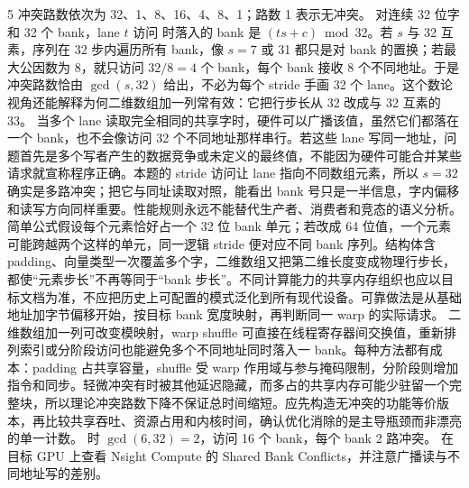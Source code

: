 \begin{solutionexercise}{5}
\conclusionheading 冲突路数依次为 32、1、8、16、4、8、1；路数 1 表示无冲突。
\discussionheading
{}
对连续 32 位字和 32 个 bank，lane $t$ 访问  时落入的 bank 是 $(ts+c)\bmod32$。若 $s$ 与 32 互素，序列在 32 步内遍历所有 bank，像 $s=7$ 或 31 都只是对 bank 的置换；若最大公因数为 8，就只访问 $32/8=4$ 个 bank，每个 bank 接收 8 个不同地址。于是冲突路数恰由 $\gcd(s,32)$ 给出，不必为每个 stride 手画 32 个 lane。这个数论视角还能解释为何二维数组加一列常有效：它把行步长从 32 改成与 32 互素的 33。
当多个 lane 读取完全相同的共享字时，硬件可以广播该值，虽然它们都落在一个 bank，也不会像访问 32 个不同地址那样串行。若这些 lane 写同一地址，问题首先是多个写者产生的数据竞争或未定义的最终值，不能因为硬件可能合并某些请求就宣称程序正确。本题的 stride 访问让 lane 指向不同数组元素，所以 $s=32$ 确实是多路冲突；把它与同址读取对照，能看出 bank 号只是一半信息，字内偏移和读写方向同样重要。性能规则永远不能替代生产者、消费者和竞态的语义分析。
简单公式假设每个元素恰好占一个 32 位 bank 单元；若改成 64 位值，一个元素可能跨越两个这样的单元，同一逻辑 stride 便对应不同 bank 序列。结构体含 padding、向量类型一次覆盖多个字，二维数组又把第二维长度变成物理行步长，都使“元素步长”不再等同于“bank 步长”。不同计算能力的共享内存组织也应以目标文档为准，不应把历史上可配置的模式泛化到所有现代设备。可靠做法是从基础地址加字节偏移开始，按目标 bank 宽度映射，再判断同一 warp 的实际请求。
二维数组加一列可改变模映射，warp shuffle 可直接在线程寄存器间交换值，重新排列索引或分阶段访问也能避免多个不同地址同时落入一 bank。每种方法都有成本：padding 占共享容量，shuffle 受 warp 作用域与参与掩码限制，分阶段则增加指令和同步。轻微冲突有时被其他延迟隐藏，而多占的共享内存可能少驻留一个完整块，所以理论冲突路数下降不保证总时间缩短。应先构造无冲突的功能等价版本，再比较共享吞吐、资源占用和内核时间，确认优化消除的是主导瓶颈而非漂亮的单一计数。
\variantheading {} 时 $\gcd(6,32)=2$，访问 16 个 bank，每个 bank 2 路冲突。
\practiceheading 在目标 GPU 上查看 Nsight Compute 的 Shared Bank Conflicts，并注意广播读与不同地址写的差别。
\end{solutionexercise}
